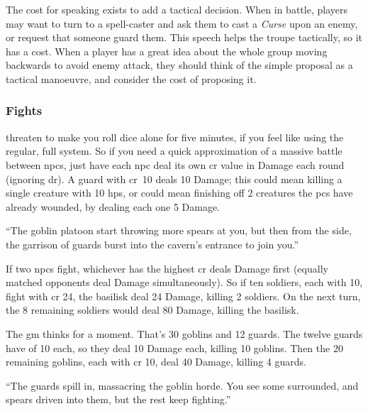 \begin{multicols}{2}
The cost for speaking exists to add a tactical decision.
When in battle, players may want to turn to a spell-caster and ask them to cast a \textit{Curse} upon an enemy, or request that someone guard them.
This speech helps the troupe tactically, so it has a cost.
When a player has a great idea about the whole group moving backwards to avoid enemy attack, they should think of the simple proposal as a tactical manoeuvre, and consider the cost of proposing it.

\subsubsection{ Fights}
\label{npcfights}
threaten to make you roll dice alone for five minutes, if you feel like using the regular, full system.
So if you need a quick approximation of a massive battle between \glspl{npc}, just have each \gls{npc} deal its own \gls{cr} value in Damage each round (ignoring \gls{dr}).
A guard with \gls{cr}~10 deals 10 Damage; this could mean killing a single creature with 10 \glspl{hp}, or could mean finishing off 2 creatures the \glspl{pc} have already wounded, by dealing each one 5 Damage.

\begin{exampletext}
  ``The goblin platoon start throwing more spears at you, but then from the side, the garrison of guards burst into the cavern's entrance to join you.''
\end{exampletext}

If two \glspl{npc} fight, whichever has the highest \gls{cr} deals Damage first (equally matched opponents deal Damage simultaneously).
So if ten soldiers, each with  10, fight  with \gls{cr} 24, the \gls{basilisk} deal 24 Damage, killing 2 soldiers.
On the next turn, the 8 remaining soldiers would deal 80 Damage, killing the \gls{basilisk}.

\begin{exampletext}

  The \gls{gm} thinks for a moment.
  That's 30 goblins and 12 guards.
  The twelve guards have  of 10 each, so they deal 10 Damage each, killing 10 goblins.
  Then the 20 remaining goblins, each with \gls{cr} 10, deal 40 Damage, killing 4 guards.

  ``The guards spill in, massacring the goblin horde.
  You see some surrounded, and spears driven into them, but the rest keep fighting.''

\end{exampletext}


\end{multicols}
